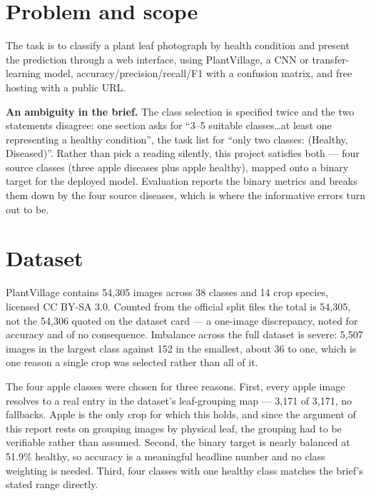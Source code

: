\documentclass[10pt,a4paper]{article}
\begin{document}
\section{Problem and scope}

The task is to classify a plant leaf photograph by health condition and present the
prediction through a web interface, using PlantVillage, a CNN or transfer-learning
model, accuracy/precision/recall/F1 with a confusion matrix, and free hosting with a
public URL.

\textbf{An ambiguity in the brief.} The class selection is specified twice and the two
statements disagree: one section asks for ``3--5 suitable classes\ldots at least one
representing a healthy condition'', the task list for ``only two classes: (Healthy,
Diseased)''. Rather than pick a reading silently, this project satisfies both --- four
source classes (three apple diseases plus apple healthy), mapped onto a binary target
for the deployed model. Evaluation reports the binary metrics and breaks them down by
the four source diseases, which is where the informative errors turn out to be.

\section{Dataset}

PlantVillage \cite{mohanty2016} contains 54{,}305 images across 38 classes and 14 crop
species, licensed CC BY-SA 3.0. Counted from the official split files the total is
54{,}305, not the 54{,}306 quoted on the dataset card --- a one-image discrepancy, noted
for accuracy and of no consequence. Imbalance across the full dataset is severe:
5{,}507 images in the largest class against 152 in the smallest, about 36 to one, which
is one reason a single crop was selected rather than all of it.

The four apple classes were chosen for three reasons. First, every apple image resolves
to a real entry in the dataset's leaf-grouping map --- 3{,}171 of 3{,}171, no fallbacks.
Apple is the only crop for which this holds, and since the argument of this report rests
on grouping images by physical leaf, the grouping had to be verifiable rather than
assumed. Second, the binary target is nearly balanced at 51.9\% healthy, so accuracy is
a meaningful headline number and no class weighting is needed. Third, four classes with
one healthy class matches the brief's stated range directly.
\end{document}

